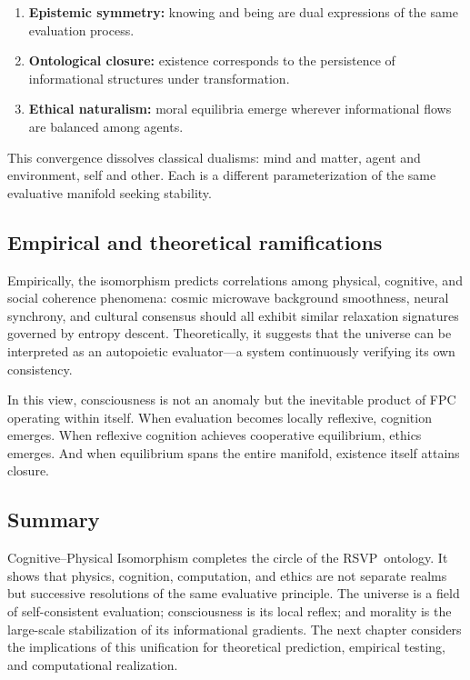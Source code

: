 \documentclass[12pt,a4paper]{article}
\newcommand{\RSVP}{RSVP}              %
\theoremstyle{plain}
\begin{document}
\begin{enumerate}[nosep]
  \item \textbf{Epistemic symmetry:} knowing and being are dual expressions of the same evaluation process.
  \item \textbf{Ontological closure:} existence corresponds to the persistence of informational structures under transformation.
  \item \textbf{Ethical naturalism:} moral equilibria emerge wherever informational flows are balanced among agents.
\end{enumerate}

This convergence dissolves classical dualisms:
mind and matter, agent and environment, self and other.
Each is a different parameterization of the same evaluative manifold seeking stability.

\subsection{Empirical and theoretical ramifications}
Empirically, the isomorphism predicts correlations among physical, cognitive, and social coherence phenomena:
cosmic microwave background smoothness, neural synchrony, and cultural consensus
should all exhibit similar relaxation signatures governed by entropy descent.
Theoretically, it suggests that the universe can be interpreted as an autopoietic evaluator---a system continuously verifying its own consistency.

In this view, consciousness is not an anomaly but the inevitable product of FPC operating within itself.
When evaluation becomes locally reflexive, cognition emerges.
When reflexive cognition achieves cooperative equilibrium, ethics emerges.
And when equilibrium spans the entire manifold, existence itself attains closure.

\subsection{Summary}
Cognitive–Physical Isomorphism completes the circle of the \RSVP\ ontology.
It shows that physics, cognition, computation, and ethics are not separate realms but successive resolutions of the same evaluative principle.
The universe is a field of self-consistent evaluation; 
consciousness is its local reflex;
and morality is the large-scale stabilization of its informational gradients.
The next chapter considers the implications of this unification for theoretical prediction, empirical testing, and computational realization.
\end{document}
